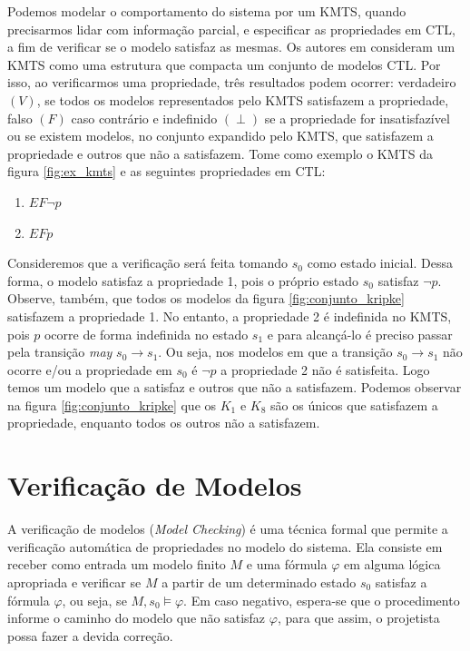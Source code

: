 \documentclass[normaltoc,capchap,capsec,times]{abnt}
\begin{document}
Podemos modelar o comportamento do sistema por um KMTS, quando precisarmos lidar com informação parcial, e especificar as propriedades em CTL, a fim de verificar se o modelo satisfaz as mesmas. 
Os autores em \cite{aline} consideram um KMTS como uma estrutura que compacta um conjunto de modelos CTL. Por isso, ao verificarmos uma propriedade, três resultados podem ocorrer: verdadeiro $(V)$, se todos os modelos representados pelo KMTS satisfazem a propriedade, falso $(F)$ caso contrário e indefinido $(\perp)$ se a propriedade for insatisfazível ou se existem modelos, no conjunto expandido pelo KMTS, que satisfazem a propriedade e outros que não a satisfazem. Tome como exemplo o KMTS da figura \ref{fig:ex_kmts} e as seguintes propriedades em CTL: 
\begin{enumerate}
	\item $EF \neg p$
	\item $EF p$
\end{enumerate}

Consideremos que a verificação será feita tomando $s_0$ como estado inicial. Dessa forma, o modelo satisfaz a propriedade 1, pois o próprio estado $s_0$ satisfaz $\neg p$. Observe, também, que todos os modelos da figura \ref{fig:conjunto_kripke} satisfazem a propriedade 1. No entanto, a propriedade 2 é indefinida no KMTS, pois $p$ ocorre de forma indefinida no estado $s_1$ e para alcançá-lo é preciso passar pela transição \textit{may} $s_0 \to s_1$. Ou seja, nos modelos em que a transição $s_0 \to s_1$ não ocorre e/ou a propriedade em $s_0$ é $\neg p$ a propriedade 2 não é satisfeita. Logo temos um modelo que a satisfaz e outros que não a satisfazem.  Podemos observar na figura \ref{fig:conjunto_kripke} que os $K_1$ e $K_8$ são os únicos que satisfazem a propriedade, enquanto todos os outros não a satisfazem.

\chapter{Verificação de Modelos}\label{cap:verificacaodemodelos}

A verificação de modelos (\textit{Model Checking}) é uma técnica formal que permite a verificação automática de propriedades no modelo do sistema. Ela consiste em receber como entrada um modelo finito $M$ e uma fórmula $\varphi$ em alguma lógica apropriada e verificar se $M$ a partir de um determinado estado $s_0$ satisfaz a fórmula $\varphi$, ou seja, se $M, s_0 \models \varphi$. Em caso negativo, espera-se que o procedimento informe o caminho do modelo que não satisfaz $\varphi$, para que assim, o projetista possa fazer a devida correção.
\end{document}
